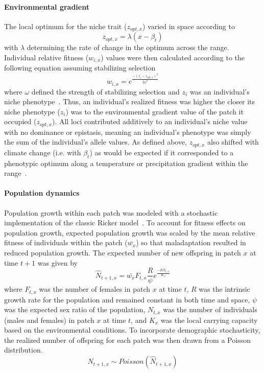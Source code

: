 \documentclass[11pt]{article}
\begin{document}
\paragraph{Environmental gradient}
The local optimum for the niche trait ($z_{opt,x}$) varied in space according to
\begin{equation}
z_{opt,x}=\lambda(x-\beta_{t})
\end{equation}
with $\lambda$ determining the rate of change in the optimum across the range. Individual relative fitness ($w_{i,x}$) values were then calculated according to the following equation assuming stabilizing selection
\begin{equation}
w_{i,x}=e^{\frac{-(z_{i}-z_{opt,x})^{2}}{2\omega^{2}}}
\end{equation}
where $\omega$ defined the strength of stabilizing selection and $z_{i}$ was an individual's niche phenotype~\citep{lande1976natural}. Thus, an individual's realized fitness was higher the closer its niche phenotype ($z_{i}$) was to the environmental gradient value of the patch it occupied ($z_{opt,x}$). All loci contributed additively to an individual's niche value with no dominance or epistasis, meaning an individual's phenotype was simply the sum of the individual's allele values. As defined above, $z_{opt,x}$ also shifted with climate change (i.e. with $\beta_{t}$) as would be expected if it corresponded to a phenotypic optimum along a temperature or precipitation gradient within the range~\citep{davis2001range}. 

\paragraph{Population dynamics}
Population growth within each patch was modeled with a stochastic implementation of the classic Ricker model~\citep{ricker1954stock, melbourne2008extinction}. To account for fitness effects on population growth, expected population growth was scaled by the mean relative fitness of individuals within the patch ($\bar{w_{x}}$) so that maladaptation resulted in reduced population growth. The expected number of new offspring in patch $x$ at time $t+1$ was given by
\begin{equation}
\hat{N}_{t+1,x}=\bar{w_{x}}F_{t,x}\frac{R}{\psi}e^{\frac{-RN_{t,x}}{K_{x}}}
\end{equation}
where $F_{t,x}$ was the number of females in patch $x$ at time $t$, $R$ was the intrinsic growth rate for the population and remained constant in both time and space, $\psi$ was the expected sex ratio of the population, $N_{t,x}$ was the number of individuals (males and females) in patch $x$ at time $t$, and $K_{x}$ was the local carrying capacity based on the environmental conditions. To incorporate demographic stochasticity, the realized number of offspring for each patch was then drawn from a Poisson distribution.
\begin{equation}
N_{t+1,x}\sim Poisson(\hat{N}_{t+1,x})
\end{equation}
\end{document}
